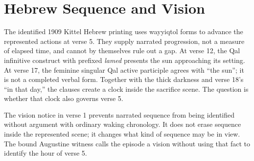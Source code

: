 \section{Hebrew Sequence and Vision}

The identified 1909 Kittel Hebrew printing uses wayyiqtol forms to advance the
represented actions at verse 5. They supply narrated progression, not a measure
of elapsed time, and cannot by themselves rule out a gap. At verse 12, the Qal
infinitive construct with prefixed \emph{lamed} presents the sun approaching
its setting. At verse 17, the feminine singular Qal active participle agrees
with ``the sun''; it is not a completed verbal form. Together with the thick
darkness and verse 18's ``in that day,'' the clauses create a clock inside the
sacrifice scene. The question is whether that clock also governs verse 5.

The vision notice in verse 1 prevents narrated sequence from being identified
without argument with ordinary waking chronology. It does not erase sequence
inside the represented scene; it changes what kind of sequence may be in view.
The bound Augustine witness calls the episode a vision without using that fact
to identify the hour of verse 5.


